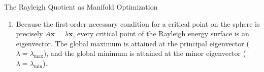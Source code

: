 \begin{ponderbox}{The Rayleigh Quotient as Manifold Optimization}
\begin{enumerate}
    \begin{equation*}
    \lambda = \mathbf{x}^T A \mathbf{x} = R_A(\mathbf{x})
    \end{equation*}
    The Lagrange multiplier is not an abstract parameter; \textbf{it is the exact objective value (Rayleigh energy) attained at that stationary point!}
    \item Because the first-order necessary condition for a critical point on the sphere is precisely $A\mathbf{x} = \lambda \mathbf{x}$, every critical point of the Rayleigh energy surface is an eigenvector. The global maximum is attained at the principal eigenvector ($\lambda = \lambda_{\max}$), and the global minimum is attained at the minor eigenvector ($\lambda = \lambda_{\min}$).
\end{enumerate}
\end{ponderbox}

